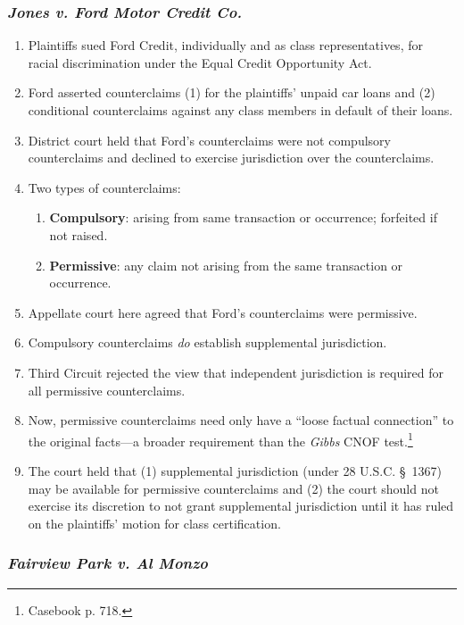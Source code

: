 \subsubsection{\emph{Jones v. Ford Motor Credit Co.}}

\begin{enumerate}
    \item Plaintiffs sued Ford Credit, individually and as class 
    representatives, for racial discrimination under the Equal Credit 
    Opportunity Act.  \item Ford asserted counterclaims (1) for the 
    plaintiffs' unpaid car loans and (2) conditional counterclaims against any 
    class members in default of their loans.
    \item District court held that Ford's counterclaims were not compulsory 
    counterclaims and declined to exercise jurisdiction over the 
    counterclaims.
    \item Two types of counterclaims:
    \begin{enumerate}
        \item \textbf{Compulsory}: arising from same transaction or 
        occurrence; forfeited if not raised.
        \item \textbf{Permissive}: any claim not arising from the same 
        transaction or occurrence.
    \end{enumerate}
    \item Appellate court here agreed that Ford's counterclaims were 
    permissive.
    \item Compulsory counterclaims \emph{do} establish supplemental 
    jurisdiction.
    \item Third Circuit rejected the view that independent jurisdiction is 
    required for all permissive counterclaims.
    \item Now, permissive counterclaims need only have a ``loose factual 
    connection'' to the original facts---a broader requirement than the 
    \emph{Gibbs} CNOF test.\footnote{Casebook p. 718.}
    \item The court held that (1) supplemental jurisdiction (under 28 U.S.C. 
    § 1367) may be available for permissive counterclaims and (2) the court 
    should not exercise its discretion to not grant supplemental jurisdiction 
    until it has ruled on the plaintiffs' motion for class certification.
\end{enumerate}

\subsubsection{\emph{Fairview Park v. Al Monzo}}

